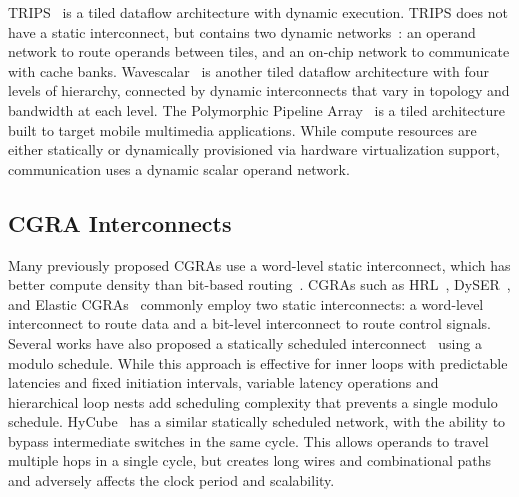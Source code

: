 TRIPS~\cite{trips} is a tiled dataflow architecture with dynamic execution. TRIPS does not have a static interconnect, but contains two dynamic networks~\cite{trips-network}: an operand network  to route operands between tiles, and an on-chip network  to communicate with cache banks. Wavescalar~\cite{wavescalar} is another tiled dataflow architecture with four levels of hierarchy, connected by dynamic interconnects that vary in topology and bandwidth at each level. The Polymorphic Pipeline Array~\cite{ppa} is a tiled architecture built to target mobile multimedia applications. While compute resources are either statically or dynamically provisioned via hardware virtualization support, communication uses a dynamic scalar operand network.

\subsection{CGRA Interconnects}
Many previously proposed CGRAs use a word-level static interconnect, which has better compute density than bit-based routing~\cite{bus-fpga}. CGRAs such as HRL~\cite{hrl}, DySER~\cite{dyser}, and Elastic CGRAs~\cite{elasticCGRAs} commonly employ two static interconnects: a word-level interconnect to route data and a bit-level interconnect to route control signals.
Several works have also proposed a statically scheduled interconnect~\cite{van2009static, dimitroulakos2006exploring, wave} using a modulo schedule. While this approach is effective for inner loops with predictable latencies and fixed initiation intervals, variable latency operations and hierarchical loop nests add scheduling complexity that prevents a single modulo schedule. HyCube~\cite{hycube} has a similar statically scheduled network, with the ability to bypass intermediate switches in the same cycle. This allows operands to travel multiple hops in a single cycle, but creates long wires and combinational paths and adversely affects the clock period and scalability.
